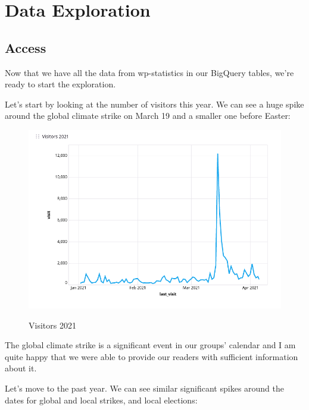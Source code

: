 %
%

\pagebreak
\section{Data Exploration}

\onehalfspacing

\subsection{Access}

Now that we have all the data from wp-statistics in our BigQuery tables, we're ready to start the exploration. 

Let's start by looking at the number of visitors this year. We can see a huge spike around the global climate strike on March 19 and a smaller one before Easter:

\begin{figure}[H]
\centering
\caption {Visitors 2021}
\includegraphics[width=\linewidth]{images/figure01.png}
\label{fig:visitors2021}
\end{figure}

The global climate strike is a significant event in our groups' calendar and I am quite happy that we were able to provide our readers with sufficient information about it.

Let's move to the past year. We can see similar significant spikes around the dates for global and local strikes, and local elections:

